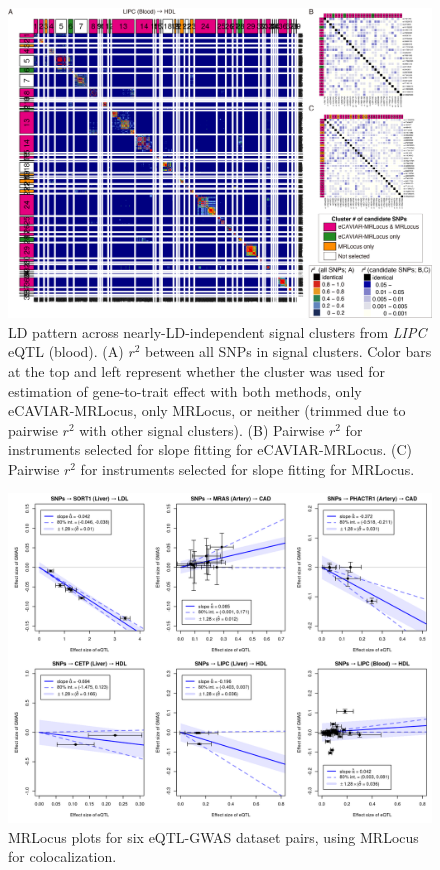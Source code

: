 \documentclass[11pt]{article}
\begin{document}
\begin{figure}[!ht]
  \centering
  \includegraphics[width=\textwidth]{figs/region/heatmap_eQTLbase.Blood_LIPC_HDL.20210114.png}
  \caption{LD pattern across nearly-LD-independent signal clusters
    from \emph{LIPC} eQTL (blood).
    (A) $r^2$ between all SNPs in signal clusters. Color bars at the
    top and left represent whether the cluster was used for estimation of
    gene-to-trait effect with both methods, only eCAVIAR-MRLocus, only
    MRLocus, or neither (trimmed due to pairwise $r^2$ with other
    signal clusters). (B) Pairwise $r^2$ for instruments selected for
    slope fitting for eCAVIAR-MRLocus. (C) Pairwise $r^2$ for
    instruments selected for slope fitting for MRLocus.}
\end{figure}

\begin{figure}[!ht]
  \centering
  \includegraphics[width=\textwidth]{figs/real_loci_mrlocus.png}
  \caption{MRLocus plots for six eQTL-GWAS dataset pairs, using
    MRLocus for colocalization.} 
\end{figure}
\end{document}
